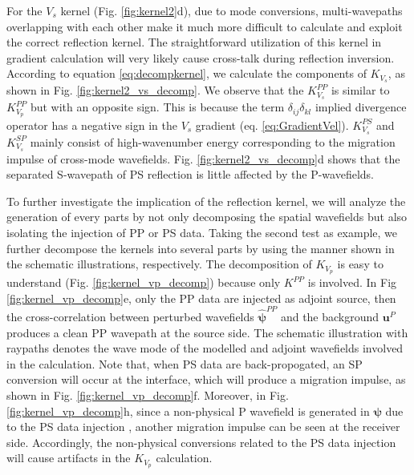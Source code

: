 \documentclass[extra,mreferee]{gji}
\newcommand{\bsy}[1]{\boldsymbol{{}#1}}
\begin{document}
For the $V_s$ kernel (Fig. \ref{fig:kernel2}d), due to mode conversions, multi-wavepaths overlapping with each other 
make it much more difficult to calculate and exploit the correct reflection kernel. 
The straightforward utilization of this kernel in gradient calculation will very likely cause 
cross-talk during reflection inversion.
According to equation
\eqref{eq:decompkernel}, we calculate the components of $K_{V_s}$, as shown in Fig.
\ref{fig:kernel2_vs_decomp}. We observe that the $K^{PP}_{V_s}$ is similar to $K^{PP}_{V_p}$ but with an opposite
sign. This is because the term $\delta_{ij}\delta_{kl}$ implied divergence operator has
a negative sign in the $V_s$ gradient (eq. \eqref{eq:GradientVel}).
$K^{PS}_{V_s}$ and $K^{SP}_{V_s}$ mainly consist of high-wavenumber energy
corresponding to the migration impulse of cross-mode wavefields. 
Fig. \ref{fig:kernel2_vs_decomp}d shows that the
separated S-wavepath of PS reflection is little affected by the P-wavefields. 

To further investigate the implication of the reflection kernel, we will
analyze the generation of every parts by not only decomposing the spatial wavefields
but also isolating the injection of PP or PS data.
Taking the second test as example, we further decompose the kernels into 
several parts by using the manner shown in the schematic illustrations, respectively. 
The decomposition of $K_{V_p}$ is easy to understand 
(Fig. \ref{fig:kernel_vp_decomp}) 
because only $K^{PP}$ is involved. In Fig
\ref{fig:kernel_vp_decomp}e, only the PP data are injected as adjoint source, then the
cross-correlation between
perturbed wavefields $\bsy{\hat\psi}^{PP}$ and the background
$\mathbf{u}^P$ produces a clean PP wavepath at the source side. The	schematic
illustration with raypaths denotes the wave mode of
the modelled and adjoint wavefields involved in the calculation. Note that,
when PS data are back-propogated, an SP conversion will
occur at the interface, which will produce a migration impulse, as shown in
Fig. \ref{fig:kernel_vp_decomp}f. Moreover, in
Fig. \ref{fig:kernel_vp_decomp}h, 
since a non-physical P wavefield is generated in $\bsy{\psi}$ due to the PS data injection
\cite[]{Ravasi2013}, 
another migration impulse can be seen at the receiver side. 
Accordingly, the non-physical conversions related to the PS data injection will
cause artifacts in the $K_{V_p}$ calculation. 
\end{document}
